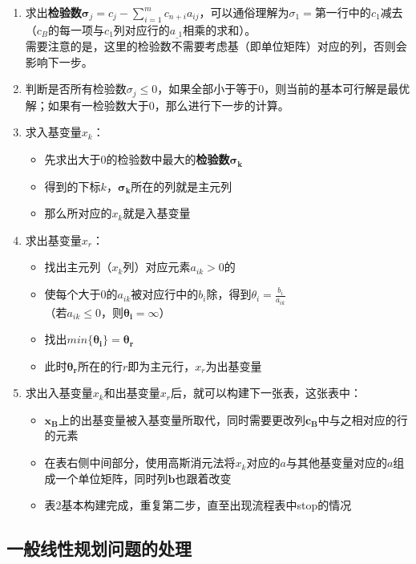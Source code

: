 \documentclass{book}
\begin{document}
\begin{enumerate}
    \item 求出\textbf{检验数}$\boldsymbol{\sigma}_j=c_j-\sum\limits_{i=1}^mc_{n+i}a_{ij}$，可以通俗理解为$\sigma_1=$第一行中的$c_1$减去（$c_B$的每一项与$c_1$列对应行的$a_{\_1}$相乘的求和）。\\
    需要注意的是，这里的检验数不需要考虑基（即单位矩阵）对应的列，否则会影响下一步。
    \item 判断是否所有检验数$\sigma_j\le0$，如果全部小于等于0，则当前的基本可行解是最优解；如果有一检验数大于0，那么进行下一步的计算。
    \item 求入基变量$x_k$：
    \begin{itemize}
        \item 先求出大于0的检验数中最大的\textbf{检验数}$\boldsymbol{\sigma_k}$
        \item 得到的下标$k$，$\boldsymbol{\sigma_k}$所在的列就是主元列
        \item 那么所对应的$x_k$就是入基变量
    \end{itemize}
    \item 求出基变量$x_r$：
    \begin{itemize}
        \item 找出主元列（$x_k$列）对应元素$a_{ik}>0$的
        \item 使每个大于0的$a_{ik}$被对应行中的$b_i$除，得到$\theta_i=\frac{b_i}{a_{ik}}$\\
        （若$a_{ik}\le0$，则$\boldsymbol{\theta_i}=\infty$）
        \item 找出$min\{\boldsymbol{\theta_i}\}=\boldsymbol{\theta_r}$
        \item 此时$\boldsymbol{\theta_r}$所在的行$r$即为主元行，$x_r$为出基变量
    \end{itemize}
    \item 求出入基变量$x_k$和出基变量$x_r$后，就可以构建下一张表，这张表中：
    \begin{itemize}
        \item $\boldsymbol{x_B}$上的出基变量被入基变量所取代，同时需要更改列$\boldsymbol{c_B}$中与之相对应的行的元素
        \item 在表右侧中间部分，使用高斯消元法将$x_k$对应的$a$与其他基变量对应的$a$组成一个单位矩阵，同时列$\boldsymbol{b}$也跟着改变
        \item 表2基本构建完成，重复第二步，直至出现流程表中stop的情况
    \end{itemize}
\end{enumerate}

\subsection{一般线性规划问题的处理}
\end{document}

